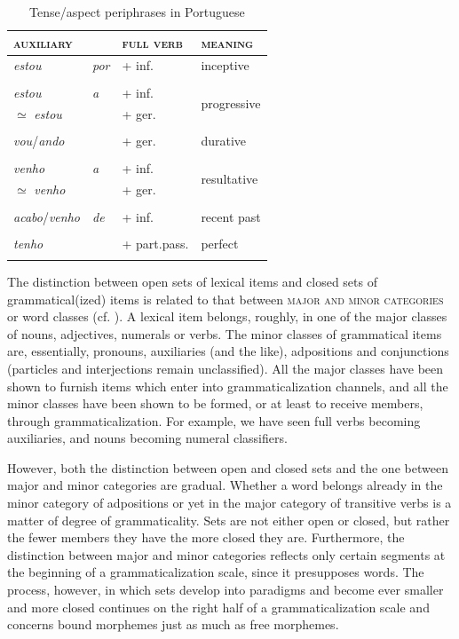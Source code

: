 \begin{table}
\begin{tabular}{llll}
\lsptoprule

\scshape auxiliary  & &  \scshape full verb & \scshape meaning\\
\midrule
\textit{estou} & \textit{por} & + inf. & inceptive\\
\\
\textit{estou} & \textit{a} &  + inf. & \multirow{2}{*}{progressive}\\
${\simeq}$ \textit{estou} & & + ger. \\
\\
\textit{vou}/\textit{ando}  & &  + ger. & durative\\
\\
\textit{venho} & \textit{a} & + inf. & \multirow{2}{*}{resultative}\\
${\simeq}$ \textit{venho}  & &  + ger. \\
\\
\textit{acabo}/\textit{venho} & \textit{de} & + inf. & recent past\\
\\
\textit{tenho}  & & + part.pass. & perfect\\
\lspbottomrule
\end{tabular}
\caption{Tense/aspect periphrases in Portuguese}\label{T5} 
\end{table}

\noindent The distinction between open sets of lexical items and closed sets of grammatical(ized) items is related to that between \textsc{major and minor categories} or word classes (cf. \citealt[435f]{Lyons1968}). A lexical item belongs, roughly, in one of the major classes of nouns, adjectives, numerals or verbs. The minor classes of grammatical items are, essentially, pronouns, auxiliaries (and the like), adpositions and conjunctions (particles and interjections remain unclassified). All the major classes have been shown to furnish items which enter into grammaticalization channels, and all the minor classes have been shown to be formed, or at least to receive members, through grammaticalization. For example, we have seen full verbs becoming auxiliaries, and nouns becoming numeral classifiers.

However, both the distinction between open and closed sets and the one between major and minor categories are gradual. Whether a word belongs already in the minor category of adpositions or yet in the major category of transitive verbs is a matter of degree of grammaticality. Sets are not either open or closed, but rather the fewer members they have the more closed they are. Furthermore, the distinction between major and minor categories reflects only certain segments at the beginning of a grammaticalization scale, since it presupposes words. The process, however, in which sets develop into paradigms and become ever smaller and more closed continues on the right half of a grammaticalization scale and concerns bound morphemes just as much as free morphemes.

